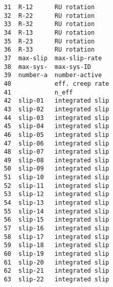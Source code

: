 \documentclass[11pt]{report}
\numberwithin{equation}{section}
\begin{document}
\begin{verbatim}
    31  R-12      RU rotation                                                 
    32  R-22      RU rotation                                                 
    33  R-32      RU rotation                                                 
    34  R-13      RU rotation                                                 
    35  R-23      RU rotation                                                 
    36  R-33      RU rotation                                                 
    37  max-slip  max-slip-rate                                               
    38  max-sys-  max-sys-ID                                                  
    39  number-a  number-active                                               
    40            eff. creep rate                                             
    41            n_eff                                                       
    42  slip-01   integrated slip                                             
    43  slip-02   integrated slip                                             
    44  slip-03   integrated slip                                             
    45  slip-04   integrated slip                                             
    46  slip-05   integrated slip                                             
    47  slip-06   integrated slip                                             
    48  slip-07   integrated slip                                             
    49  slip-08   integrated slip                                             
    50  slip-09   integrated slip                                             
    51  slip-10   integrated slip                                             
    52  slip-11   integrated slip                                             
    53  slip-12   integrated slip                                             
    54  slip-13   integrated slip                                             
    55  slip-14   integrated slip                                             
    56  slip-15   integrated slip                                             
    57  slip-16   integrated slip                                             
    58  slip-17   integrated slip                                             
    59  slip-18   integrated slip                                             
    60  slip-19   integrated slip                                             
    61  slip-20   integrated slip                                             
    62  slip-21   integrated slip                                             
    63  slip-22   integrated slip                                             

\end{verbatim}
\end{document}
